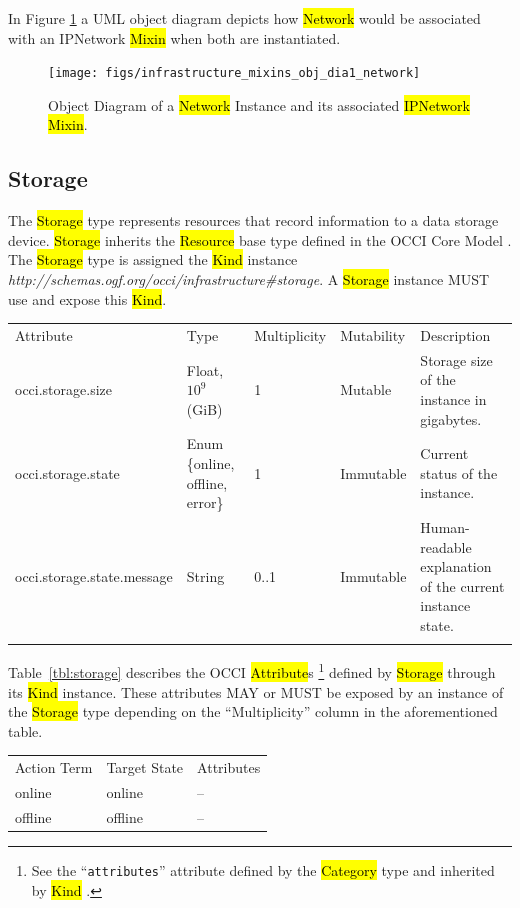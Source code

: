 \documentclass[10pt,a4paper]{article}
\begin{document}
In Figure \ref{fig:network_mixin} a UML object diagram depicts how
\hl{Network} would be associated with an IPNetwork \hl{Mixin} when
both are instantiated.

\begin{figure}[!h]
	\centering
	\texttt{[image: figs/infrastructure\_mixins\_obj\_dia1\_network]}
	\caption{Object Diagram of a \hl{Network} Instance and its
	associated \hl{IPNetwork} \hl{Mixin}.}
	\label{fig:network_mixin}
\end{figure}

\subsection{Storage}
The \hl{Storage} type represents resources that record information to a
data storage device.  \hl{Storage} inherits the \hl{Resource} base
type defined in the OCCI Core Model \cite{occi:core}.  The
\hl{Storage} type is assigned the \hl{Kind} instance
\textit{http://schemas.ogf.org/occi/infrastructure\#storage}.  A
\hl{Storage} instance MUST use and expose this \hl{Kind}.

{
	\begin{tabular}{lp{2.5cm}p{1cm}lp{5cm}}
	\toprule
	Attribute&Type&Multi\-plicity&Mutability&Description\\
	\colrule
	occi.storage.size & Float, $10^9$ (GiB) & 1 & Mutable
	& Storage size of the instance in gigabytes.\\
	occi.storage.state & Enum \{online, off\-line, error\} & 1 & Immutable
	& Current status of the instance.\\
	occi.storage.state.message & String & 0..1 & Immutable
	& Human-readable explanation of the current instance state.\\
	\botrule
	\end{tabular}
}

Table~\ref{tbl:storage} describes the OCCI \hl{Attribute}s%
\footnote{See the ``{\tt attributes}'' attribute defined by the
  \hl{Category} type and inherited by \hl{Kind} \cite{occi:core}.}
defined by \hl{Storage} through its \hl{Kind} instance. These attributes
MAY or MUST be exposed by an instance of the \hl{Storage} type
depending on the ``Multiplicity'' column in the aforementioned table.

{
	\begin{tabular}{lll}
	\toprule
	Action Term&Target State&Attributes\\
	\colrule
	online & online & --\\
	offline & offline & --\\
	\end{tabular}
}
\end{document}

